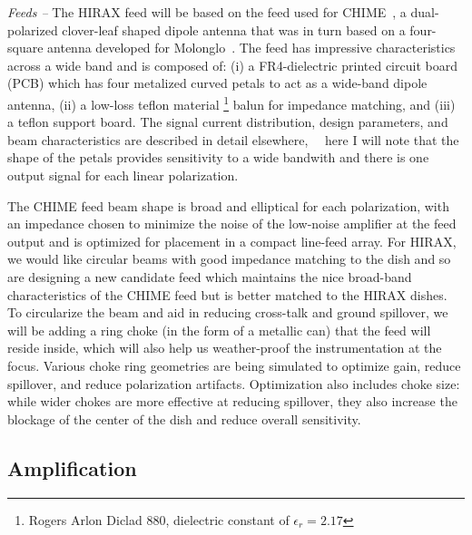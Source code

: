 \documentclass[]{spie}  %
\begin{document}
\textit{Feeds -- } The HIRAX feed will be based on the feed used for CHIME~\cite{6887670}, a dual-polarized clover-leaf shaped dipole antenna that was in turn based on a four-square antenna developed for Molonglo~\cite{Martin2008}. The feed has impressive characteristics across a wide band and is composed of: (i) a FR4-dielectric printed circuit board (PCB) which has four metalized curved petals to act as a wide-band dipole antenna, (ii) a low-loss teflon material \footnote{Rogers Arlon Diclad 880, dielectric constant of $\epsilon_{r} = 2.17$} balun for impedance matching, and (iii) a teflon support board. The signal current distribution, design parameters, and beam characteristics are described in detail elsewhere,~\cite{2014SPIE.9145E..22B}~\cite{6887670} here I will note that the shape of the petals provides sensitivity to a wide bandwith and there is one output signal for each linear polarization. \newline

The CHIME feed beam shape is broad and elliptical for each polarization, with an impedance chosen to minimize the noise of the low-noise amplifier at the feed output and is optimized for placement in a compact line-feed array. For HIRAX, we would like circular beams with good impedance matching to the dish and so are designing a new candidate feed which maintains the nice broad-band characteristics of the CHIME feed but is better matched to the HIRAX dishes. To circularize the beam and aid in reducing cross-talk and ground spillover, we will be adding a ring choke (in the form of a metallic can) that the feed will reside inside, which will also help us weather-proof the instrumentation at the focus. Various choke ring geometries are being simulated to optimize gain, reduce spillover, and reduce polarization artifacts. Optimization also includes choke size: while wider chokes are more effective at reducing spillover, they also increase the blockage of the center of the dish and reduce overall sensitivity. \newline


\subsection{Amplification}
\end{document}
